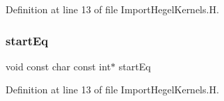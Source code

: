 Definition at line 13 of file Import\+Hegel\+Kernels.\+H.

\hypertarget{ImportHegelKernels_8H_ac76cb674e8152fbd2b1f8beaee0971d1}{}\label{ImportHegelKernels_8H_ac76cb674e8152fbd2b1f8beaee0971d1} 
\subsubsection{\texorpdfstring{start\+Eq}{startEq}}
{\footnotesize\ttfamily void const char const int$\ast$ start\+Eq}



Definition at line 13 of file Import\+Hegel\+Kernels.\+H.

